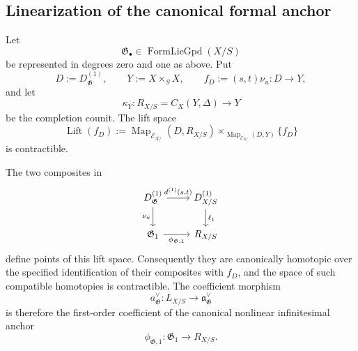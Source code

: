 \subsection{Linearization of the canonical formal anchor}

\begin{theorem}
\label{thm:first-order-linearization-canonical-anchor}
Let
\[
    \mathfrak G_\bullet
    \in
    \operatorname{FormLieGpd}(X/S)
\]
be represented in degrees zero and one as above.  Put
\[
    D:=D^{(1)}_{\mathfrak G},
    \qquad
    Y:=X\times_SX,
    \qquad
    f_D:=(s,t)\nu_u:D\longrightarrow Y,
\]
and let
\[
    \kappa_Y:R_{X/S}=C_X(Y,\Delta)\longrightarrow Y
\]
be the completion counit.  The lift space
\[
    \operatorname{Lift}(f_D)
    :=
    \operatorname{Map}_{\mathcal E_{X/}}(D,R_{X/S})
    \times_{
        \operatorname{Map}_{\mathcal E_{X/}}(D,Y)
    }
    \{f_D\}
\]
is contractible.

The two composites in
\[
\begin{tikzcd}
D^{(1)}_{\mathfrak G}
    \arrow[r,"{d^{(1)}(s,t)}"]
    \arrow[d,"\nu_u"']
&
D^{(1)}_{X/S}
    \arrow[d,"\ell_1"]
\\
\mathfrak G_1
    \arrow[r,"{\phi_{\mathfrak G,1}}"']
&
R_{X/S}
\end{tikzcd}
\]
define points of this lift space.  Consequently they are canonically
homotopic over the specified identification of their composites with
$f_D$, and the space of such compatible homotopies is contractible.
The coefficient morphism
\[
    a_{\mathfrak G}^{\vee}:
    L_{X/S}
    \longrightarrow
    \mathfrak a_{\mathfrak G}^{\vee}
\]
is therefore the first-order coefficient of the canonical nonlinear
infinitesimal anchor
\[
    \phi_{\mathfrak G,1}:
    \mathfrak G_1\longrightarrow R_{X/S}.
\]
\end{theorem}

